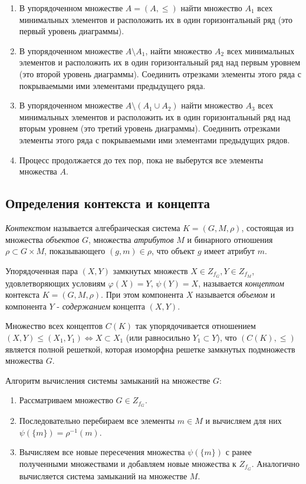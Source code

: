 \documentclass[bachelor, och, labwork]{shiza}
\begin{document}
	\begin{enumerate}
		\item В упорядоченном множестве $A = (A,\leq)$ найти множество $A_1$ всех минимальных элементов и расположить их в один горизонтальный ряд (это первый уровень диаграммы).
		\item В упорядоченном множестве $A \setminus A_1$, найти множество $A_2$ всех минимальных элементов и
		расположить их в один горизонтальный ряд над первым уровнем (это второй уровень диаграммы). Соединить
		отрезками элементы этого ряда с покрываемыми ими элементами предыдущего ряда.
		\item В упорядоченном множестве $A \setminus (A_1 \cup A_2)$ найти множество $A_3$ всех минимальных
		элементов и расположить их в один горизонтальный ряд над вторым уровнем (это третий уровень диаграммы).
		Соединить отрезками элементы этого ряда с покрываемыми ими элементами предыдущих рядов.
		\item Процесс продолжается до тех пор, пока не выберутся все элементы множества $A$.
	\end{enumerate}	

    \subsection{Определения контекста и концепта}

	\textit{Контекстом} называется алгебраическая система $K = (G, M, \rho)$, состоящая из множества \textit{объектов} $G$, множества \textit{атрибутов} $M$ и бинарного отношения $\rho \subset G \times M$, показывающего $(g, m) \in \rho$, что объект $g$ имеет атрибут $m$.
	
	Упорядоченная пара $(X, Y)$ замкнутых множеств $X \in Z_{f_G}, Y \in Z_{f_M}$, удовлетворяющих условиям $\varphi(X) = Y$, $\psi(Y) = X$, называется \textit{концептом} контекста $K = (G, M, \rho)$. При этом компонента $X$ называется \textit{объемом} и компонента $Y$ - \textit{содержанием} концепта $(X, Y)$.
	
	Множество всех концептов $C(K)$ так упорядочивается отношением \\ $(X, Y) \leq (X_1, Y_1) \Leftrightarrow X \subset X_1$ (или равносильно $Y_1 \subset Y$), что $(C(K), \leq)$ является полной решеткой, которая изоморфна решетке замкнутых подмножеств множества $G$.
	
	Алгоритм вычисления системы замыканий на множестве $G$:
	\begin{enumerate}
		\item Рассматриваем множество $G \in Z_{f_G}$.
		\item Последовательно перебираем все элементы $m \in M$ и вычисляем для них $\psi(\{m\}) = \rho^{-1}(m)$.
		\item Вычисляем все новые пересечения множества $\psi(\{m\})$ с ранее полученными множествами и добавляем новые множества к $Z_{f_G}$. Аналогично вычисляется система замыканий на множестве $M$.
	\end{enumerate}
	
\end{document}

